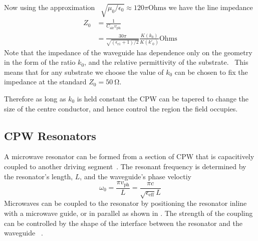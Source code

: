 Now using the approximation~\cite{Collin2007}
$\sqrt{\mu_0/\epsilon_0}\approx120\pi\text{Ohms}$ we have the line
impedance~\cite{Simons2004}
\begin{align}
  Z_0 &= \frac{1}{C_\text{air} v_\text{ph}} \\
    &= \frac{30 \pi}{\sqrt{(\epsilon_\text{r1}+1)/2}} \frac{K(k_0)}{K(k'_0)}
    \text{Ohms}
\end{align}
Note that the impedance of the waveguide has dependence only on the geometry in
the form of the ratio $k_0$, and the relative permittivity of the
substrate.~\cite{Simons2004} This means that for any substrate we choose the
value of $k_0$ can be chosen to fix the impedance at the standard $Z_0 =
\SI{50}{\ohm}$.

Therefore as long as $k_0$ is held constant the CPW can be tapered to change the
size of the centre conductor, and hence control the region the field occupies.

\subsection{CPW Resonators}
\label{mws:resonators}

A microwave resonator can be formed from a section of CPW that is capacitively
coupled to another driving segment~\cite{Day2003}. The resonant frequency is
determined by the resonator's length, $L$, and the waveguide's phase
veloctiy~\cite{}
%
\begin{equation}
  \omega_0 = \frac{\pi v_\text{ph}}{L} = \frac{\pi
  c}{\sqrt{\epsilon_\text{eff}} L}
\end{equation}
%
Microwaves can be coupled to the resonator by positioning the resonator inline
with a microwave guide, or in parallel as shown in . The strength of the coupling can be controlled by the shape of the
interface between the resonator and the waveguide~\cite{doi:10.1063/1.3010859}
.


